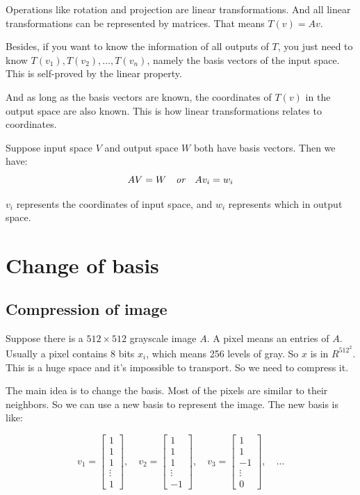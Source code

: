 \documentclass[10pt,a4paper,oneside,numbers=noenddot]{scrbook}
\theoremstyle{ctplain}
\theoremstyle{ctresult}
\begin{document}
Operations like rotation and projection are linear transformations. And all linear
transformations can be represented by matrices. That means $T(v) = Av$.

Besides, if you want to know the information of all outputs of $T$, you just need to
know $T(v_1), T(v_2), \ldots, T(v_n)$, namely the basis vectors of the input space.
This is self-proved by the linear property.

And as long as the basis vectors are known, the coordinates of $T(v)$ in the output space
are also known. This is how linear transformations relates to coordinates.

Suppose input space $V$ and output space $W$ both have basis vectors. Then we have:
\[
  AV = W \quad \emph{or} \quad Av_i = w_i
\]

$v_i$ represents the coordinates of input space, and $w_i$ represents which in output space.

\section{Change of basis}
\subsection{Compression of image}
Suppose there is a $512 \times 512$ grayscale image $A$. A pixel means an entries of $A$.
Usually a pixel contains 8 bits $x_i$, which means 256 levels of gray. So $x$ is in $R^{512^2}$.
This is a huge space and it's impossible to transport. So we need to compress it.

The main idea is to change the basis. Most of the pixels are similar to their neighbors. So
we can use a new basis to represent the image. The new basis is like:

\[
  v_1 = \begin{bmatrix}
    1 \\ 1 \\ 1 \\ \vdots \\ 1
  \end{bmatrix}, \quad
  v_2 = \begin{bmatrix}
    1 \\ 1 \\ 1 \\ \vdots \\ -1
  \end{bmatrix}, \quad
  v_3 = \begin{bmatrix}
    1 \\ 1 \\ -1 \\ \vdots \\ 0
  \end{bmatrix}, \quad \ldots
\]
\end{document}
